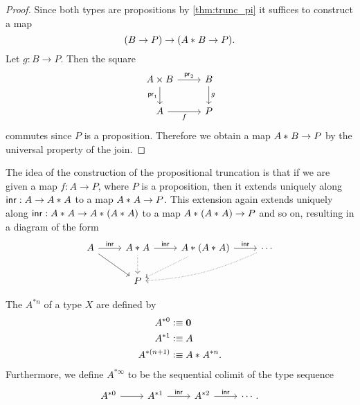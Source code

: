 \begin{proof}
Since both types are propositions by \cref{thm:trunc_pi} it suffices to construct a map
\begin{equation*}
(B\to P)\to ({A}\ast_{}{B}\to P).
\end{equation*}
Let $g:B\to P$. Then the square
\begin{equation*}
\begin{tikzcd}
A\times B \arrow[r,"\proj 2"] \arrow[d,swap,"\proj 1"] & B \arrow[d,"g"] \\
A \arrow[r,swap,"f"] & P
\end{tikzcd}
\end{equation*}
commutes since $P$ is a proposition. Therefore we obtain a map ${A}\ast_{}{B}\to P$ by the universal property of the join.
\end{proof}

The idea of the construction of the propositional truncation is that if we are given a map $f:A\to P$, where $P$ is a proposition, then it extends uniquely along ${\mathsf{inr}}:A\to {A}\ast_{}{A}$ to a map ${A}\ast_{}{A}\to P$. This extension again extends uniquely along ${\mathsf{inr}}:{A}\ast_{}{A}\to {A}\ast_{}{({A}\ast_{}{A})}$ to a map ${A}\ast_{}{({A}\ast_{}{A})}\to P$ and so on, resulting in a diagram of the form
\begin{equation*}
\begin{tikzcd}
A \arrow[dr] \arrow[r,"\inr"] & \join{A}{A} \arrow[d,densely dotted] \arrow[r,"\inr"] & \join{A}{(\join{A}{A})} \arrow[dl,densely dotted] \arrow[r,"\inr"] & \cdots \arrow[dll,densely dotted,bend left=10] \\
& P
\end{tikzcd}
\end{equation*}

\begin{defn}
The  $A^{\ast n}$ of a type $X$ are defined by
\begin{align*}
A^{\ast 0} & \vcentcolon\equiv \mathbf{0} \\
A^{\ast 1} & \vcentcolon\equiv A \\
A^{\ast (n+1)} & \vcentcolon\equiv {A}\ast_{}{A^{\ast n}}.
\end{align*}
Furthermore, we define $A^{\ast\infty}$ to be the sequential colimit of the type sequence
\begin{equation*}
\begin{tikzcd}
A^{\ast 0} \arrow[r] & A^{\ast 1} \arrow[r,"\inr"] & A^{\ast 2} \arrow[r,"\inr"] & \cdots.
\end{tikzcd}
\end{equation*}
\end{defn}


